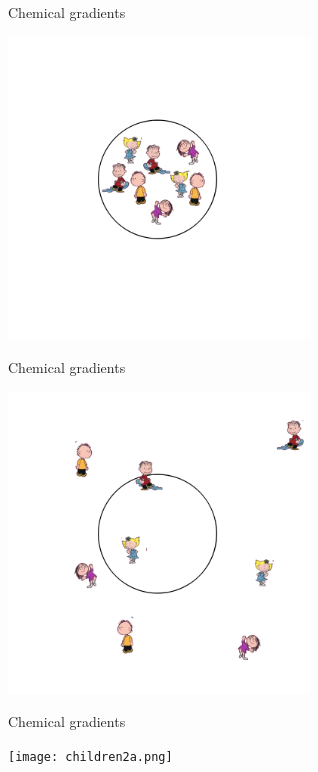 \documentclass{beamer}
\begin{document}
\begin{frame}{Chemical gradients}
\begin{center}
    \includegraphics[height=8cm]{children1.png}
\end{center}
\end{frame}

\begin{frame}{Chemical gradients}
\begin{center}
    \includegraphics[height=8cm]{children2.png}
\end{center}
\end{frame}


\begin{frame}{Chemical gradients}
\begin{center}
    \texttt{[image: children2a.png]}
\end{center}
\end{frame}
\end{document}
